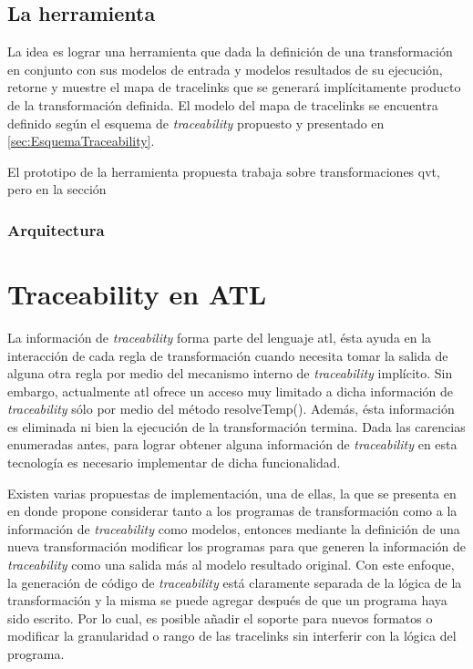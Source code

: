 \documentclass[a4paper,12pt,oneside,spanish]{book}
\begin{document}
\subsection{La herramienta}

La idea es lograr una herramienta que dada la definición de una transformación en conjunto con sus modelos de entrada y modelos resultados de su ejecución, retorne y muestre el mapa de tracelinks que se generará implícitamente producto de la transformación definida. El modelo del mapa de tracelinks se encuentra definido según el esquema de \textit{traceability} propuesto y presentado en \ref{sec:EsquemaTraceability}.

El prototipo de la herramienta propuesta trabaja sobre transformaciones \gls{qvt}, pero en la sección 


\subsubsection{Arquitectura}



\section{Traceability en ATL}
\label{sec:ATLTtraceability}

La información de \textit{traceability} forma parte del lenguaje \gls{atl}, ésta ayuda en la interacción de cada regla de transformación cuando necesita tomar la salida de alguna otra regla por medio del mecanismo interno de \textit{traceability} implícito. Sin embargo, actualmente \gls{atl} ofrece un acceso muy limitado a dicha información de \textit{traceability} sólo por medio del método resolveTemp(). Además, ésta información es eliminada ni bien la ejecución de la transformación termina. Dada las carencias enumeradas antes, para lograr obtener alguna información de \textit{traceability} en esta tecnología es necesario implementar de dicha funcionalidad.

Existen varias propuestas de implementación, una de ellas, la que se presenta en \cite{Jouault} en donde propone considerar tanto a los programas de transformación como a la información de \textit{traceability} como modelos, entonces mediante la definición de una nueva transformación modificar los programas para que generen la información de \textit{traceability} como una salida más al modelo resultado original. Con este enfoque, la generación de código de \textit{traceability} está claramente separada de la lógica de la transformación y la misma se puede agregar después de que un programa haya sido escrito. Por lo cual, es posible añadir el soporte para nuevos formatos o modificar la granularidad o rango de las tracelinks sin interferir con la lógica del programa.
\end{document}
